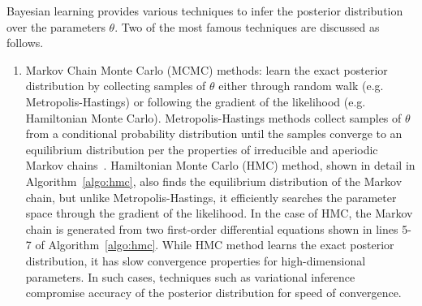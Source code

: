 Bayesian learning provides various techniques to infer the posterior distribution
over the parameters $\theta$. Two of the most famous techniques are discussed as follows.
\begin{enumerate}
  \item Markov Chain Monte Carlo (MCMC) methods: learn the exact posterior
  distribution by collecting samples of $\theta$ either through random walk
  (e.g. Metropolis-Hastings) or following the gradient of the likelihood (e.g.
  Hamiltonian Monte Carlo). Metropolis-Hastings methods collect samples of
  $\theta$ from a conditional probability distribution until the samples
  converge to an equilibrium distribution per the properties of irreducible and
  aperiodic Markov chains~\cite{gilks1995markov}. Hamiltonian Monte Carlo (HMC)
  method, shown in detail in Algorithm~\ref{algo:hmc}, also finds the
  equilibrium distribution of the Markov chain, but unlike Metropolis-Hastings,
  it efficiently searches the parameter space through the gradient of the
  likelihood. In the case of HMC, the Markov chain is generated from two
  first-order differential equations shown in lines 5-7 of
  Algorithm~\ref{algo:hmc}. While HMC method learns the exact posterior
  distribution, it has slow convergence properties for high-dimensional
  parameters. In such cases, techniques such as variational inference compromise
  accuracy of the posterior distribution for speed of convergence.
  

\end{enumerate}
